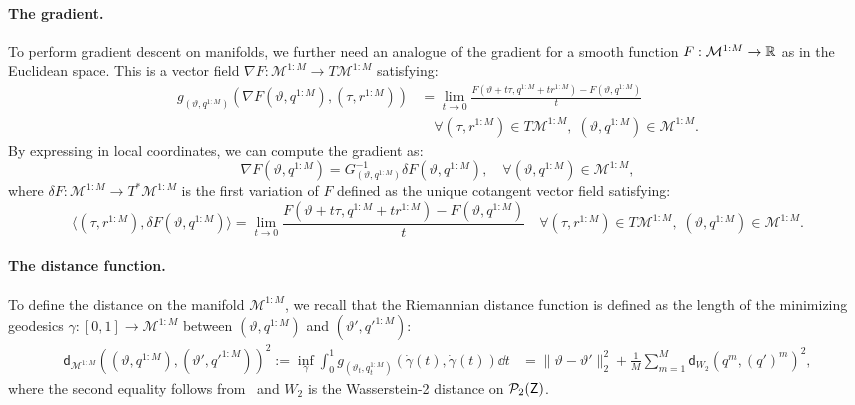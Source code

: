 \paragraph{The gradient.} To perform gradient descent on manifolds, we further need an analogue of the gradient for a smooth function $F: \mathcal{M}^{1:M}\to \mathbb{R}$ as in the Euclidean space. This is a vector field $\nabla F: \mathcal{M}^{1:M}\to T\mathcal{M}^{1:M}$ satisfying:
\begin{equation}
    \begin{aligned}
    g_{(\vartheta, q^{1:M})} (\nabla F(\vartheta, q^{1:M}), (\tau, r^{1:M}))
    &= \lim_{t \to 0} \frac{F(\vartheta + t\tau, q^{1:M} + tr^{1:M}) - F(\vartheta, q^{1:M})}{t} \\
    &\quad \forall (\tau, r^{1:M}) \in T\mathcal{M}^{1:M},\; (\vartheta, q^{1:M}) \in \mathcal{M}^{1:M}.
    \end{aligned}
\end{equation}
By expressing in local coordinates, we can compute the gradient as:
\begin{equation}\label{eq:app_inv_tensor_grad}
    \nabla F(\vartheta, q^{1:M}) = G_{(\vartheta, q^{1:M})}^{-1} \delta F(\vartheta, q^{1:M}), \quad \forall (\vartheta, q^{1:M})\in \mathcal{M}^{1:M},
\end{equation}
where $\delta F: \mathcal{M}^{1:M}\to T^*\mathcal{M}^{1:M}$ is the first variation of $F$ defined as the unique cotangent vector field satisfying:
\begin{equation}\label{eq:app_first_variation}
    \langle (\tau, r^{1:M}), \delta F(\vartheta, q^{1:M}) \rangle = \lim_{t \to 0} \frac{F(\vartheta + t\tau, q^{1:M} + tr^{1:M}) - F(\vartheta, q^{1:M})}{t} 
\quad \forall (\tau, r^{1:M}) \in T\mathcal{M}^{1:M},\; (\vartheta, q^{1:M}) \in \mathcal{M}^{1:M}.
\end{equation}
\paragraph{The distance function.} To define the distance on the manifold $\mathcal{M}^{1:M}$, we recall that the Riemannian distance function is defined as the length of the minimizing geodesics $\gamma: [0,1]\to \mathcal{M}^{1:M}$ between $(\vartheta, q^{1:M})$ and $(\vartheta', q'^{1:M})$:
\begin{align}
    \mathsf{d}_{\mathcal{M}^{1:M}}((\vartheta, q^{1:M}), (\vartheta', q'^{1:M}))^2 := \inf_{\gamma} \int_0^1 g_{(\vartheta_t,q_t^{1:M})}(\dot{\gamma}(t), \dot{\gamma}(t)) \dd t
    &= \|\vartheta-\vartheta'\|_2^2 + \frac{1}{M}\sum_{m=1}^M \mathsf{d}_{W_2}(q^m, (q')^m)^2,
\end{align}
where the second equality follows from~\citet[Section 4.3]{otto31012001} and $W_2$ is the Wasserstein-2 distance on $\mathcal{P}_2({\mathsf{Z}})$.

